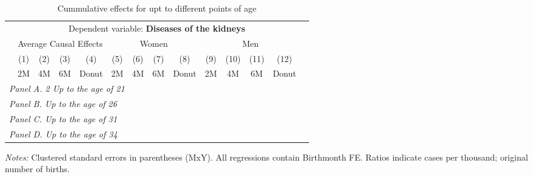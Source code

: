  \begin{table}[H] \begin{threeparttable} \centering \caption{Cummulative effects for upt to different points of age} {\def\sym#1{\ifmmode^{#1}\else\(^{#1}\)\fi} \begin{tabular}{l*{13}{c}} \toprule & \multicolumn{12}{c}{Dependent variable: \textbf{Diseases of the kidneys}} \\ \cmidrule(lr){2-13}
            &\multicolumn{4}{c}{Average Causal Effects}         &\multicolumn{4}{c}{Women}                          &\multicolumn{4}{c}{Men}                            \\\cmidrule(lr){2-5}\cmidrule(lr){6-9}\cmidrule(lr){10-13}
            &\multicolumn{1}{c}{(1)}&\multicolumn{1}{c}{(2)}&\multicolumn{1}{c}{(3)}&\multicolumn{1}{c}{(4)}&\multicolumn{1}{c}{(5)}&\multicolumn{1}{c}{(6)}&\multicolumn{1}{c}{(7)}&\multicolumn{1}{c}{(8)}&\multicolumn{1}{c}{(9)}&\multicolumn{1}{c}{(10)}&\multicolumn{1}{c}{(11)}&\multicolumn{1}{c}{(12)}\\
            &\multicolumn{1}{c}{2M}&\multicolumn{1}{c}{4M}&\multicolumn{1}{c}{6M}&\multicolumn{1}{c}{Donut}&\multicolumn{1}{c}{2M}&\multicolumn{1}{c}{4M}&\multicolumn{1}{c}{6M}&\multicolumn{1}{c}{Donut}&\multicolumn{1}{c}{2M}&\multicolumn{1}{c}{4M}&\multicolumn{1}{c}{6M}&\multicolumn{1}{c}{Donut}\\
\midrule
 \multicolumn{13}{l}{\emph{Panel A. 2 Up to the age of 21}} \\   \midrule\multicolumn{13}{l}{\emph{Panel B. Up to the age of 26}} \\   \midrule\multicolumn{13}{l}{\emph{Panel C. Up to the age of 31}} \\   \midrule\multicolumn{13}{l}{\emph{Panel D. Up to the age of 34}} \\   
\bottomrule \end{tabular} } \begin{tablenotes} \item \scriptsize \emph{Notes:} Clustered standard errors in parentheses (MxY). All regressions contain Birthmonth FE. Ratios indicate cases per thousand; original number of births. \end{tablenotes} \end{threeparttable} \end{table} 
